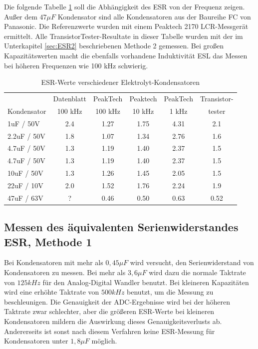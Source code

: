 Die folgende Tabelle \ref{tab:capESR} soll die Abhängigkeit des ESR von der Frequenz zeigen.
Außer dem \(47 \mu F\) Kondensator sind alle Kondensatoren aus der Baureihe FC von Panasonic.
Die Referenzwerte wurden mit einem Peaktech 2170 LCR-Messgerät ermittelt.
Alle TransistorTester-Resultate in dieser Tabelle wurden mit der im Unterkapitel \ref{sec:ESR2} 
beschriebenen Methode 2 gemessen.
Bei großen Kapazitätswerten macht die ebenfalls vorhandene Induktivität ESL das Messen bei höheren Frequenzen 
wie 100 kHz schwierig.


\begin{table}[H]
  \begin{center}
    \begin{tabular}{| l | c | c | c | c | c |}
   \hline
            & Datenblatt & PeakTech  & Peaktech & PeakTech & Transistor- \\
Kondensator & 100 kHz    & 100 kHz   & 10 kHz   & 1 kHz    & tester  \\
    \hline
    \hline
1uF / 50V    & 2.4       & 1.27      & 1.75     & 4.31     &  2.1 \\
    \hline
2.2uF / 50V  & 1.8       & 1.07      & 1.34     & 2.76     &  1.6 \\
    \hline
4.7uF / 50V  & 1.3       & 1.19      & 1.40     & 2.37     &  1.5 \\
    \hline
4.7uF / 50V  & 1.3       & 1.19      & 1.40     & 2.37     &  1.5 \\
    \hline
10uF / 50V   & 1.3       & 1.26      & 1.45     & 2.05     &  1.5 \\
    \hline
22uF / 10V   & 2.0       & 1.52      & 1.76     & 2.24     &  1.9 \\
    \hline
47uF / 63V   & ?         & 0.46      & 0.50     & 0.63     &  0.52 \\
    \hline
    \end{tabular}
  \end{center}
  \caption{ESR-Werte verschiedener Elektrolyt-Kondensatoren}
  \label{tab:capESR} 
\end{table}


\subsection{Messen des äquivalenten Serienwiderstandes ESR, Methode 1}
Bei Kondensatoren mit mehr als \(0,45 \mu F\) wird versucht, den Serienwiderstand von Kondensatoren zu messen.
Bei mehr als \(3,6 \mu F\) wird dazu die normale Taktrate von \(125 kHz\) für den Analog-Digital Wandler benutzt.
Bei kleineren Kapazitäten wird eine erhöhte Taktrate von \(500 kHz\) benutzt, um die Messung zu beschleunigen.
Die Genauigkeit der ADC-Ergebnisse wird bei der höheren Taktrate zwar schlechter, aber die größeren ESR-Werte
bei kleineren Kondensatoren mildern die Auswirkung dieses Genauigkeitsverlusts ab. 
Andererseits ist sonst nach diesem Verfahren keine ESR-Messung für Kondensatoren unter \(1,8 \mu F\) möglich.

